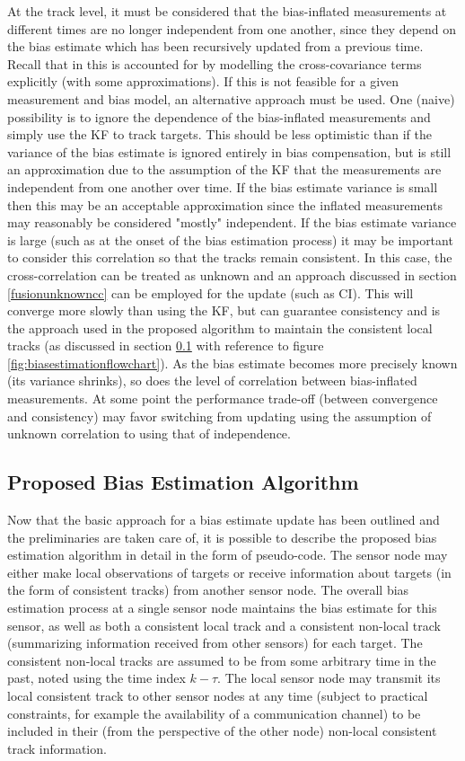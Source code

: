 \documentclass[journal]{IEEEtran}
\begin{document}
At the track level, it must be considered that the bias-inflated measurements at different times are no longer independent from one another, since they depend on the bias estimate which has been recursively updated from a previous time. Recall that in \cite{ying20103d} this is accounted for by modelling the cross-covariance terms explicitly (with some approximations). If this is not feasible for a given measurement and bias model, an alternative approach must be used. One (naive) possibility is to ignore the dependence of the bias-inflated measurements and simply use the KF to track targets. This should be less optimistic than if the variance of the bias estimate is ignored entirely in bias compensation, but is still an approximation due to the assumption of the KF that the measurements are independent from one another over time. If the bias estimate variance is small then this may be an acceptable approximation since the inflated measurements may reasonably be considered "mostly" independent. If the bias estimate variance is large (such as at the onset of the bias estimation process) it may be important to consider this correlation so that the tracks remain consistent. In this case, the cross-correlation can be treated as unknown and an approach discussed in section \ref{fusionunknowncc} can be employed for the update (such as CI). This will converge more slowly than using the KF, but can guarantee consistency and is the approach used in the proposed algorithm to maintain the consistent local tracks (as discussed in section \ref{proposedalgorithm} with reference to figure \ref{fig:biasestimationflowchart}). As the bias estimate becomes more precisely known (its variance shrinks), so does the level of correlation between bias-inflated measurements. At some point the performance trade-off (between convergence and consistency) may favor switching from updating using the assumption of unknown correlation to using that of independence.

\subsection{Proposed Bias Estimation Algorithm} \label{proposedalgorithm}
Now that the basic approach for a bias estimate update has been outlined and the preliminaries are taken care of, it is possible to describe the proposed bias estimation algorithm in detail in the form of pseudo-code. The sensor node may either make local observations of targets or receive information about targets (in the form of consistent tracks) from another sensor node. The overall bias estimation process at a single sensor node maintains the bias estimate for this sensor, as well as both a consistent local track and a consistent non-local track (summarizing information received from other sensors) for each target. The consistent non-local tracks are assumed to be from some arbitrary time in the past, noted using the time index $k-\tau$. The local sensor node may transmit its local consistent track to other sensor nodes at any time (subject to practical constraints, for example the availability of a communication channel) to be included in their (from the perspective of the other node) non-local consistent track information.
\end{document}
